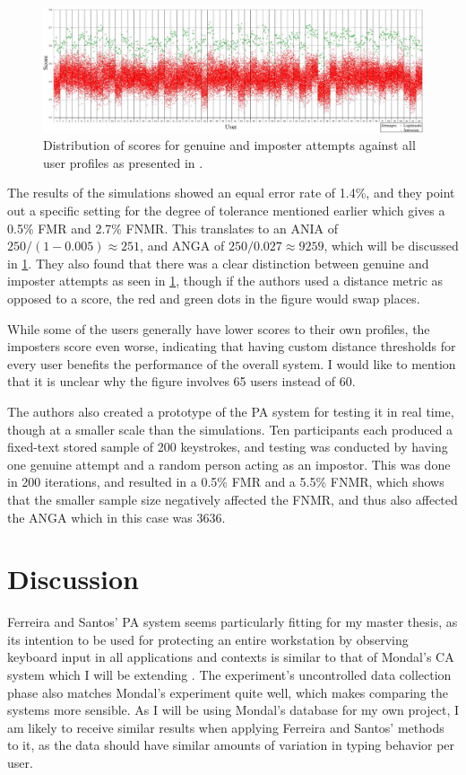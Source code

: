 \documentclass[informationsecurity]{gucmasterproject}
\begin{document}
\begin{figure}[h]
    \centering
    \includegraphics[width=1\textwidth]{ferreira/distr}
    \caption{Distribution of scores for genuine and imposter attempts against all user profiles as presented in \cite{superResults}.}
    \label{fig:ferreira-distr}
\end{figure}

The results of the simulations showed an equal error rate of 1.4\%, and they point out a specific setting for the degree of tolerance mentioned earlier which gives a 0.5\% FMR and 2.7\% FNMR.
This translates to an ANIA of $250 / (1-0.005) \approx{251}$, and ANGA of $250 / 0.027  \approx{9259}$, which will be discussed in \cref{sec:ferreira-discussion}.
They also found that there was a clear distinction between genuine and imposter attempts as seen in \cref{fig:ferreira-distr}, though if the authors used a distance metric as opposed to a score, the red and green dots in the figure would swap places. 

While some of the users generally have lower scores to their own profiles, the imposters score even worse, indicating that having custom distance thresholds for every user benefits the performance of the overall system.
I would like to mention that it is unclear why the figure involves 65 users instead of 60.

The authors also created a prototype of the PA system for testing it in real time, though at a smaller scale than the simulations.
Ten participants each produced a fixed-text stored sample of 200 keystrokes, and testing was conducted by having one genuine attempt and a random person acting as an impostor. This was done in 200 iterations, and resulted in a 0.5\% FMR and a 5.5\% FNMR, which shows that the smaller sample size negatively affected the FNMR, and thus also affected the ANGA which in this case was 3636.

\section{Discussion}
\label{sec:ferreira-discussion}
Ferreira and Santos' PA system seems particularly fitting for my master thesis, as its intention to be used for protecting an entire workstation by observing keyboard input in all applications and contexts is similar to that of Mondal's CA system which I will be extending \cite{mondal}.
The experiment's uncontrolled data collection phase also matches Mondal's experiment quite well, which makes comparing the systems more sensible.
As I will be using Mondal's database for my own project, I am likely to receive similar results when applying Ferreira and Santos' methods to it, as the data should have similar amounts of variation in typing behavior per user.
\end{document}
